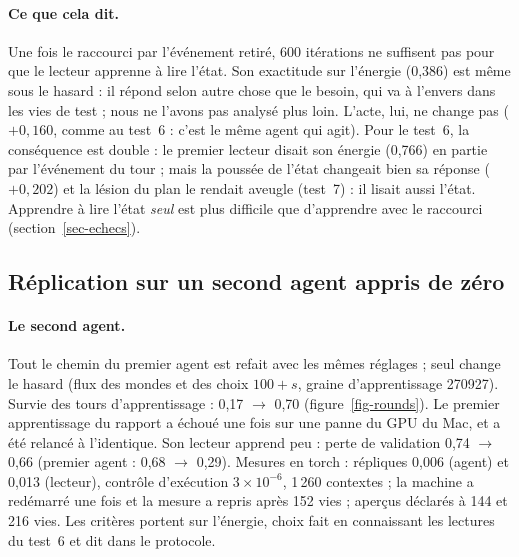 \documentclass[11pt,a4paper]{article}
\begin{document}
\paragraph{Ce que cela dit.} Une fois le raccourci par l'événement retiré, 600
itérations ne suffisent pas pour que le lecteur apprenne à lire l'état. Son
exactitude sur l'énergie (0,386) est même sous le hasard : il répond selon autre
chose que le besoin, qui va à l'envers dans les vies de test ; nous ne l'avons pas
analysé plus loin. L'acte, lui, ne change pas ($+0,160$, comme au test~6 : c'est le
même agent qui agit). Pour le test~6, la conséquence est double : le premier lecteur
disait son énergie (0,766) en partie par l'événement du tour ; mais la poussée de
l'état changeait bien sa réponse ($+0,202$) et la lésion du plan le rendait aveugle
(test~7) : il lisait aussi l'état. Apprendre à lire l'état \emph{seul} est plus
difficile que d'apprendre avec le raccourci (section~\ref{sec-echecs}).

\subsection{Réplication sur un second agent appris de zéro}
\label{sec-repl}

\paragraph{Le second agent.} Tout le chemin du premier agent est refait avec les
mêmes réglages ; seul change le hasard (flux des mondes et des choix $100+s$,
graine d'apprentissage 270927). Survie des tours d'apprentissage : 0,17 $\to$ 0,70
(figure~\ref{fig-rounds}). Le premier apprentissage du rapport a échoué une fois
sur une panne du GPU du Mac, et a été relancé à l'identique. Son lecteur apprend
peu : perte de validation 0,74 $\to$ 0,66 (premier agent : 0,68 $\to$ 0,29).
Mesures en torch : répliques 0,006 (agent) et 0,013 (lecteur), contrôle d'exécution
$3\times10^{-6}$, 1\,260 contextes ; la machine a redémarré une fois et la mesure a
repris après 152 vies ; aperçus déclarés à 144 et 216 vies. Les critères portent sur
l'énergie, choix fait en connaissant les lectures du test~6 et dit dans le
protocole.
\end{document}
